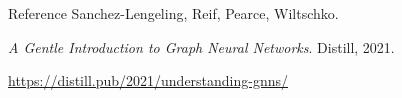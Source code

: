 \documentclass[10pt,aspectratio=169]{ntuabeamer}
\begin{document}
\begin{frame}{Reference}
  \small
  Sanchez-Lengeling, Reif, Pearce, Wiltschko.

  \vspace{0.15cm}
  \emph{A Gentle Introduction to Graph Neural Networks}. Distill, 2021.

  \vspace{0.2cm}
  \href{https://distill.pub/2021/understanding-gnns/}{https://distill.pub/2021/understanding-gnns/}
\end{frame}
\end{document}
